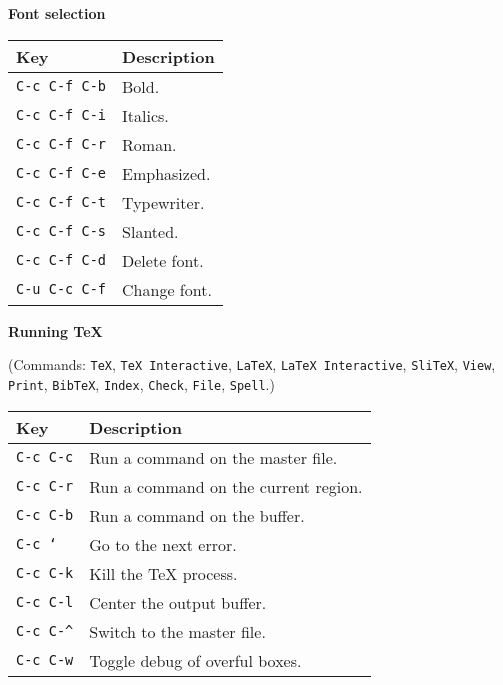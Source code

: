 \documentclass{article}
\begin{document}
\noindent
\textbf{Font selection}

\smallskip

\noindent
\begin{tabular}{p{\firstcol}p{\secondcol}}
\hline
\textbf{Key} & \textbf{Description}\\
\hline
\texttt{C-c C-f C-b}
& Bold.\\
\texttt{C-c C-f C-i}
& Italics.\\
\texttt{C-c C-f C-r}
& Roman.\\
\texttt{C-c C-f C-e}
& Emphasized.\\
\texttt{C-c C-f C-t}
& Typewriter.\\
\texttt{C-c C-f C-s}
& Slanted.\\
\texttt{C-c C-f C-d}
& Delete font.\\
\texttt{C-u C-c C-f}
& Change font.
\end{tabular}

\newpage

\noindent
\textbf{Running \TeX{}}

\smallskip

\noindent
(Commands: \texttt{TeX}, \texttt{TeX Interactive}, \texttt{LaTeX},
\texttt{LaTeX Interactive}, \texttt{SliTeX}, \texttt{View},
\texttt{Print}, \texttt{BibTeX}, \texttt{Index}, \texttt{Check},
\texttt{File}, \texttt{Spell}.)

\smallskip

\noindent
\begin{tabular}{p{\firstcol}p{\secondcol}}
\hline
\textbf{Key} & \textbf{Description}\\
\hline
\texttt{C-c C-c}
& Run a command on the master file.\\
\texttt{C-c C-r}
& Run a command on the current region.\\
\texttt{C-c C-b}
& Run a command on the buffer.\\
\texttt{C-c `}
& Go to the next error.\\
\texttt{C-c C-k}
& Kill the \TeX{} process.\\
\texttt{C-c C-l}
& Center the output buffer.\\
\texttt{C-c C-\^{}}
& Switch to the master file.\\
\texttt{C-c C-w}
& Toggle debug of overful boxes.\\
\end{tabular}
\end{document}
